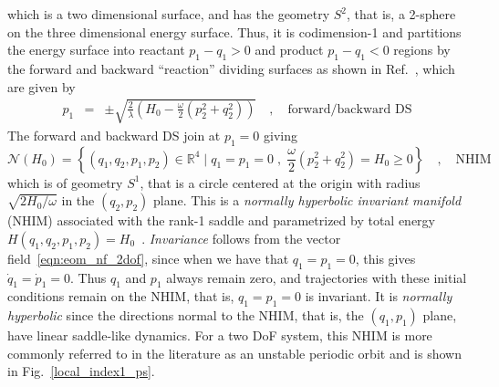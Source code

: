 \documentclass{ws-ijbc}
\begin{document}
%
which is a two dimensional surface, and has the geometry $S^2$, that is, a 2-sphere on the three dimensional energy surface. Thus, it is codimension-1 and partitions the energy surface into reactant $p_1 - q_1 > 0$ and product $p_1 - q_1 < 0$ regions by the forward and backward ``reaction'' dividing surfaces as shown in Ref.~\cite{waalkens2004direct}, which are given by
%
\begin{equation}
\begin{aligned}
p_1 & = & \pm \sqrt{\frac{2}{\lambda}\left(H_0 - \frac{\omega}{2}\left(p_2^2 + q_2^2\right) \right)} \quad , \quad \text{forward/backward DS} 
\end{aligned}
\end{equation}
%
The forward and backward DS join at $p_1 = 0$ giving
%
\begin{equation}
\mathcal{N}(H_0) = \left\{ (q_1,q_2,p_1,p_2) \in \mathbb{R}^4 \; \vert \; q_1 = p_1 = 0 \; , \; \frac{\omega}{2}\left(p_2^2 + q_2^2 \right) = H_0 \geq 0 \right\} \quad , \quad \text{NHIM}
\label{eqn:sep_quad_ham2dof_nhim}
\end{equation}
%
which is of geometry $S^1$, that is a circle centered at the origin with radius $\sqrt{2H_0/\omega}$ in the $(q_2,p_2)$ plane. This is a {\em normally hyperbolic invariant manifold} (NHIM) associated with the rank-1 saddle and parametrized by total energy $H(q_1,q_2,p_1,p_2) = H_0$~\cite{wiggins2013normally}. {\em Invariance} follows from the vector field~\eqref{eqn:eom_nf_2dof}, since when we have that $q_1 = p_1 =0$, this gives $\dot{q}_1 = \dot{p}_1 =0$. Thus $q_1$ and $p_1$ always remain zero, and trajectories with these initial conditions remain on the NHIM, that is, $q_1 = p_1 =0$ is invariant. It is {\em normally hyperbolic} since the directions normal to the NHIM, that is, the $(q_1, p_1)$ plane, have linear saddle-like dynamics. For a two DoF system, this NHIM is more commonly referred to in the literature as an unstable periodic orbit and is shown in Fig.~\ref{local_index1_ps}.
\end{document}
